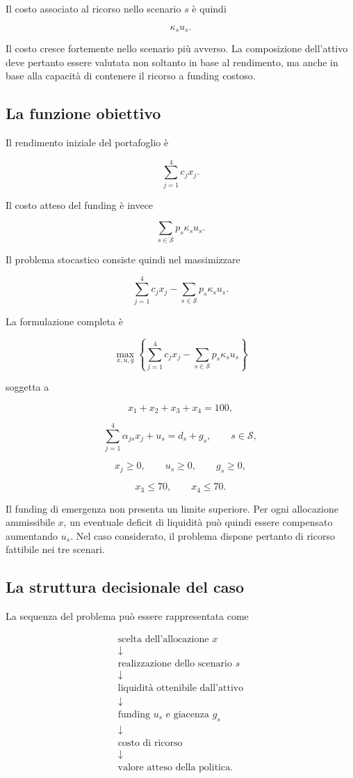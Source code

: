 Il costo associato al ricorso nello scenario \(s\) \`e quindi

\[
\kappa_s u_s.
\]

Il costo cresce fortemente nello scenario pi\`u avverso. La composizione
dell'attivo deve pertanto essere valutata non soltanto in base al rendimento,
ma anche in base alla capacit\`a di contenere il ricorso a funding costoso.

\subsection{La funzione obiettivo}

Il rendimento iniziale del portafoglio \`e

\[
\sum_{j=1}^{4}c_jx_j.
\]

Il costo atteso del funding \`e invece

\[
\sum_{s\in\mathcal{S}}
p_s\kappa_su_s.
\]

Il problema stocastico consiste quindi nel massimizzare

\[
\sum_{j=1}^{4}c_jx_j
-
\sum_{s\in\mathcal{S}}
p_s\kappa_su_s.
\]

La formulazione completa \`e

\[
\max_{x,u,g}
\left\{
\sum_{j=1}^{4}c_jx_j
-
\sum_{s\in\mathcal{S}}
p_s\kappa_su_s
\right\}
\]

\noindent soggetta a

\[
x_1+x_2+x_3+x_4=100,
\]

\[
\sum_{j=1}^{4}\alpha_{js}x_j
+
u_s
=
d_s+g_s,
\qquad
s\in\mathcal{S},
\]

\[
x_j\geq 0,
\qquad
u_s\geq 0,
\qquad
g_s\geq 0,
\]

\[
x_3\leq 70,
\qquad
x_4\leq 70.
\]

Il funding di emergenza non presenta un limite superiore. Per ogni
allocazione ammissibile \(x\), un eventuale deficit di liquidit\`a pu\`o
quindi essere compensato aumentando \(u_s\). Nel caso considerato, il
problema dispone pertanto di ricorso fattibile nei tre scenari.

\subsection{La struttura decisionale del caso}

La sequenza del problema pu\`o essere rappresentata come

\[
\begin{array}{c}
\text{scelta dell'allocazione }x
\\[3pt]
\downarrow
\\[3pt]
\text{realizzazione dello scenario }s
\\[3pt]
\downarrow
\\[3pt]
\text{liquidit\`a ottenibile dall'attivo}
\\[3pt]
\downarrow
\\[3pt]
\text{funding }u_s\text{ e giacenza }g_s
\\[3pt]
\downarrow
\\[3pt]
\text{costo di ricorso}
\\[3pt]
\downarrow
\\[3pt]
\text{valore atteso della politica}.
\end{array}
\]

